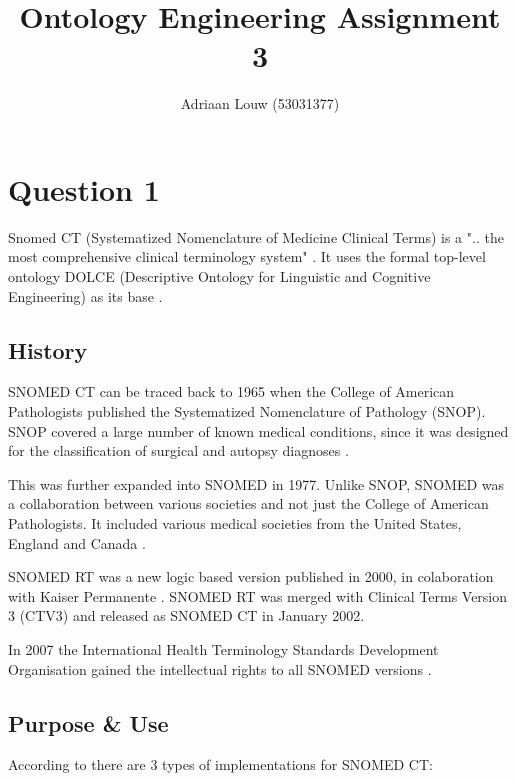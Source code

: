 \documentclass[12pt,a4paper]{article}
\title{Ontology Engineering Assignment 3}
\author{Adriaan Louw (53031377)}
\begin{document}
\maketitle
\newpage
\section{Question 1}

Snomed CT (Systematized Nomenclature of Medicine Clinical Terms) is a ".. the most comprehensive clinical terminology system" \citep[p1]{analysis}. It uses the formal top-level ontology DOLCE (Descriptive Ontology for Linguistic and Cognitive Engineering) as its base \citep[p2]{analysis}.  

\subsection{History}

SNOMED CT can be traced back to 1965 when the College of American Pathologists published the Systematized Nomenclature of Pathology (SNOP). SNOP covered a large number of known medical conditions, since it was designed for the classification of surgical and autopsy diagnoses \citep{Cote1980}.

This was further expanded into SNOMED in 1977. Unlike SNOP, SNOMED was a collaboration between various societies and not just the College of American Pathologists. It included various medical societies from the United States, England and Canada \citep{Cote1980}. 

SNOMED RT was a new logic based version published in 2000, in colaboration with Kaiser Permanente \citep{sn2018,nih}. SNOMED RT was merged with Clinical Terms Version 3 (CTV3) and released as SNOMED CT in January 2002. \citep{sn2018}

In 2007 the International Health Terminology Standards Development Organisation gained the intellectual rights to all SNOMED versions \citep{nih}.

\subsection{Purpose \& Use}

According to \cite{snomedcttech2015} there are 3 types of implementations for SNOMED CT:
\end{document}
